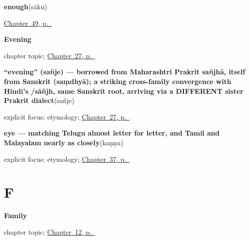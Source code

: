 \noindent\begin{minipage}[t]{\linewidth}
\raggedright
\textbf{enough}\enspace\emph{}\enspace(sāku)\par
\footnotesize \hyperref[ch:ka-replies]{Chapter~49, p.~\pageref*{ch:ka-replies}}
\end{minipage}\par\smallskip

\noindent\begin{minipage}[t]{\linewidth}
\raggedright
\textbf{Evening}\par
\footnotesize chapter topic; \hyperref[ch:ka-evening]{Chapter~27, p.~\pageref*{ch:ka-evening}}
\end{minipage}\par\smallskip

\noindent\begin{minipage}[t]{\linewidth}
\raggedright
\textbf{\textquotedblleft{}evening\textquotedblright{} (sañje) — borrowed from Maharashtri Prakrit sañjhā, itself from Sanskrit  (saṃdhyā); a striking cross-family convergence with Hindi's /sāñjh, same Sanskrit root, arriving via a DIFFERENT sister Prakrit dialect}\enspace\emph{}\enspace(sañje)\par
\footnotesize explicit focus: etymology; \hyperref[ch:ka-evening]{Chapter~27, p.~\pageref*{ch:ka-evening}}
\end{minipage}\par\smallskip

\noindent\begin{minipage}[t]{\linewidth}
\raggedright
\textbf{eye — matching Telugu almost letter for letter, and Tamil and Malayalam nearly as closely}\enspace\emph{}\enspace(kaṇṇu)\par
\footnotesize explicit focus: etymology; \hyperref[ch:ka-face-words]{Chapter~37, p.~\pageref*{ch:ka-face-words}}
\end{minipage}\par\smallskip

\section*{F}

\noindent\begin{minipage}[t]{\linewidth}
\raggedright
\textbf{Family}\par
\footnotesize chapter topic; \hyperref[ch:ka-family]{Chapter~12, p.~\pageref*{ch:ka-family}}
\end{minipage}\par\smallskip

